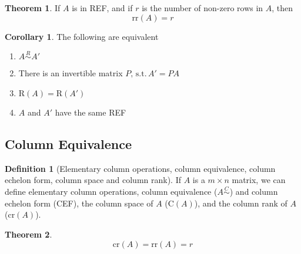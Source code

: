 \documentclass[fleqn, a4paper, 12pt, draft]{article}
\theoremstyle{definition}
\newtheorem{definition}{Definition} %
\theoremstyle{theorem}
\newtheorem{theorem}{Theorem} %
\newtheorem{corollary}{Corollary}
\theoremstyle{remark}
\newcommand{\suchthat}{\mathrm{\,s.t.\,}}
\newcommand{\R}{\mathrm{R}}
\newcommand{\C}{\mathrm{C}}
\newcommand{\rr}{\mathrm{rr}}
\numberwithin{corollary}{theorem}
\numberwithin{equation}{theorem}
\begin{document}
\begin{theorem}
	If $A$ is in REF, and if $r$ is the number of non-zero rows in $A$, then
	\begin{equation*}
	\rr(A) = r
	\end{equation*}
\end{theorem}

\begin{corollary}
	The following are equivalent
	\begin{enumerate}
		\item $A \stackrel{R}{\sim} A'$
		\item There is an invertible matrix $P, \suchthat A' = P A$
		\item $\R(A) = \R(A')$
		\item $A$ and $A'$ have the same REF
	\end{enumerate}
\end{corollary}

\subsection{Column Equivalence}

\begin{definition}[Elementary column operations, column equivalence, column echelon form, column space and column rank]
	If $A$ is a $m \times n$ matrix, we can define elementary column operations, column equivalence ($A \stackrel{C}{\sim}$) and column echelon form (CEF), the column space of $A$ ($\C(A)$), and the column rank of $A$ ($\mathrm{cr}(A)$).
\end{definition}

\begin{theorem}
	\begin{equation*}
	\mathrm{cr}(A) = \rr(A) =  r
	\end{equation*}
\end{theorem}
\end{document}
